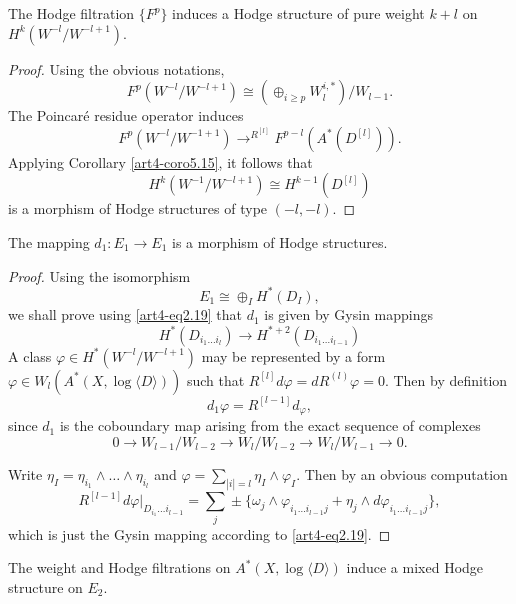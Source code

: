 \setcounter{lemma}{19}
\begin{lemma}\label{art4-lem5.20}
The Hodge filtration $\{F^p\}$ induces a Hodge structure of pure weight $k+l$ on $H^k (W^{-l} / W^{-l+1})$.
\end{lemma}

\begin{proof}
Using the obvious notations,
$$
F^p (W^{-l} / W^{-l+1}) \cong (\oplus_{i\geqslant p} W^{i,\ast}_l)/ W_{l-1}.
$$
The Poincar\'e residue operator induces
$$
F^p (W^{-l}/ W^{-1+1}) {\displaystyle{\mathop{\longrightarrow}^{R^{[l]}}}} F^{p-l} (A^{\ast} (D^{[l]})).
$$
Applying Corollary \ref{art4-coro5.15}, it follows that 
$$
H^k (W^{-1}/ W^{-l+1}) \cong H^{k-1} (D^{[l]})
$$
is a morphism of Hodge structures of type $(-l, -l)$.
\end{proof}

\begin{lemma}\label{art4-lem5.21}
The mapping $d_1 : E_1 \to E_1$ is a morphism of Hodge structures.
\end{lemma}

\begin{proof}
Using the isomorphism
$$
E_1 \cong \oplus_I H^\ast (D_I), 
$$
we shall prove using \eqref{art4-eq2.19} that $d_1$ is given by Gysin mappings 
$$
H^\ast (D_{i_1\ldots i_l}) \to H^{\ast+2} (D_{i_1 \ldots i_{l-1}})
$$
A class $\varphi \in H^\ast (W^{-l}/ W^{-l+1})$ may be represented by a form $\varphi \in W_l (A^\ast (X, \log \langle D \rangle))$ such that $R^{[l]} d \varphi = d R^{(l)} \varphi =0$. Then by definition
$$
d_1 \varphi = R^{[l-1]} d_\varphi,
$$\pageoriginale
since $d_1$ is the coboundary map arising from the exact sequence of complexes
$$
0 \to W_{l-1}/ W_{l-2} \to W_l /W_{l-2} \to W_l / W_{l-1} \to 0.
$$

Write $\eta_I = \eta_{i_1} \wedge \ldots \wedge \eta_{i_l}$ and $\varphi =\sum\limits_{|i| =l} \eta_I \wedge \varphi_I$. Then by an obvious computation
$$
R^{[l-1]} d \varphi|_{D_{i_1} \ldots i_{l-1}} = \sum\limits_{j} \pm \{\omega_j \wedge \varphi_{i_1 \ldots i_{l - 1} j} + \eta_j \wedge d \varphi_{i_1 \ldots i_{l-1} j}\},
$$
which is just the Gysin mapping according to \eqref{art4-eq2.19}.
\end{proof}

\setcounter{coro}{21}
\begin{coro}\label{art4-coro5.22}
The weight and Hodge filtrations on $A^\ast (X, \log \langle D \rangle)$ induce a mixed Hodge structure on $E_2$.
\end{coro}

